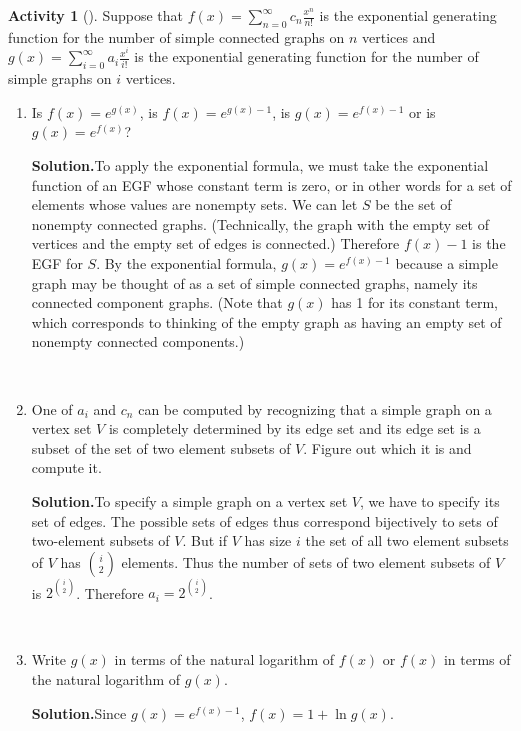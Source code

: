 \documentclass[10pt,]{book}
\theoremstyle{plain}
\theoremstyle{definition}
\newtheorem{activity}[project]{Activity}
\numberwithin{equation}{chapter}
\begin{document}
\begin{activity}[]\label{activity-381}
Suppose that \(f(x) = \sum_{n=0}^\infty c_n \frac{x^n}{n!}\) is the exponential generating function for the number of simple connected graphs on \(n\) vertices and \(g(x) = \sum_{i=0}^\infty a_i \frac{x^i}{i!}\) is the exponential generating function for the number of simple graphs on \(i\) vertices.%
~\par
\begin{enumerate}[label=(\alph*)]
 \item Is \(f(x) = e^{g(x)}\), is \(f(x) = e^{g(x)-1}\), is \(g(x) = e^{f(x)-1}\) or is \(g(x) = e^{f(x)}\)?%
\par\medskip\noindent%
\textbf{Solution.}\quad To apply the exponential formula, we must take the exponential function of an EGF whose constant term is zero, or in other words for a set of elements whose values are nonempty sets. We can let \(S\) be the set of nonempty connected graphs. (Technically, the graph with the empty set of vertices and the empty set of edges is connected.) Therefore \(f(x) -1\) is the EGF for \(S\). By the exponential formula, \(g(x)=e^{f(x)-1}\) because a simple graph may be thought of as a set of simple connected graphs, namely its connected component graphs. (Note that \(g(x)\) has 1 for its constant term, which corresponds to thinking of the empty graph as having an empty set of nonempty connected components.)%

~\par
\item One of \(a_i\) and \(c_n\) can be computed by recognizing that a simple graph on a vertex set \(V\) is completely determined by its edge set and its edge set is a subset of the set of two element subsets of \(V\). Figure out which it is and compute it.%
\par\medskip\noindent%
\textbf{Solution.}\quad To specify a simple graph on a vertex set \(V\), we have to specify its set of edges. The possible sets of edges thus correspond bijectively to sets of two-element subsets of \(V\). But if \(V\) has size \(i\) the set of all two element subsets of \(V\) has \(\binom{i}{2}\) elements. Thus the number of sets of two element subsets of \(V\) is \(2^\binom{i}{2}\). Therefore \(a_i = 2^\binom{i}{2}\).%

~\par
\item Write \(g(x)\) in terms of the natural logarithm of \(f(x)\) or \(f(x)\) in terms of the natural logarithm of  \(g(x)\).%
\par\medskip\noindent%
\textbf{Solution.}\quad Since \(g(x) = e^{f(x)-1}\), \(f(x) = 1+ \ln g(x)\).%


\end{enumerate}
\end{activity}
\end{document}

